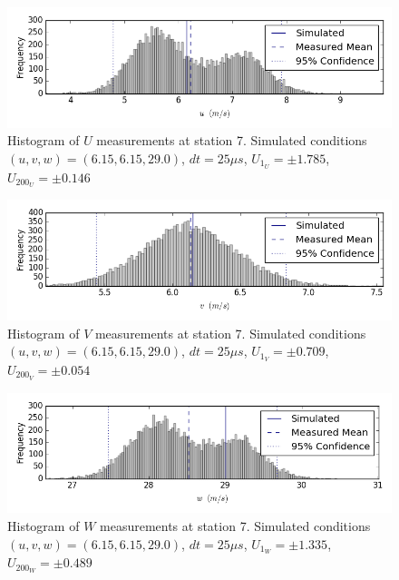\begin{figure}[H]
\centering
\includegraphics[width=6in]{figs/Ely_May28th07001/uncertainty_Ely_May28th07001_U}
\caption{Histogram of $U$ measurements at station 7. Simulated conditions $(u,v,w)=(6.15, 6.15, 29.0)$, $dt=25 \mu s$, $U_1_U=\pm 1.785$, $U_200_U=\pm 0.146$}
\label{fig:uncertainty_Ely_May28th07001_U}
\end{figure}


\begin{figure}[H]
\centering
\includegraphics[width=6in]{figs/Ely_May28th07001/uncertainty_Ely_May28th07001_V}
\caption{Histogram of $V$ measurements at station 7. Simulated conditions $(u,v,w)=(6.15, 6.15, 29.0)$, $dt=25 \mu s$, $U_1_V=\pm 0.709$, $U_200_V=\pm 0.054$}
\label{fig:uncertainty_Ely_May28th07001_V}
\end{figure}


\begin{figure}[H]
\centering
\includegraphics[width=6in]{figs/Ely_May28th07001/uncertainty_Ely_May28th07001_W}
\caption{Histogram of $W$ measurements at station 7. Simulated conditions $(u,v,w)=(6.15, 6.15, 29.0)$, $dt=25 \mu s$, $U_1_W=\pm 1.335$, $U_200_W=\pm 0.489$}
\label{fig:uncertainty_Ely_May28th07001_W}
\end{figure}


